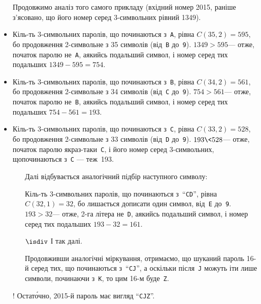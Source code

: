 \begin{\veryLongExamplesFontSize}
\begin{itemize}[leftmargin=*,itemsep=0pt,partopsep=0pt,topsep=0pt,parsep=0pt]
\item[] Продовжимо аналіз того самого прикладу (вхідний номер 2015, раніше з’ясовано, що його номер серед 3-символьних рівний 1349).

\item Кіль-ть 3-символьних паролів, що починаються з~\texttt{A}, рівна ${C(35,2) = 595}$, бо продовження %
2-символьне з 35 символів (від~\texttt{B} до~\texttt{9}). ${1349>595}$\nolinebreak[3] --- отже, початок паролю не~\texttt{A}, а\nolinebreak[2] якийсь подальший символ, і номер %
серед тих подальших ${1349-595=754}$.

\item Кіль-ть 3-символьних паролів, що починаються з~\texttt{B}, рівна ${C(34,2) = 561}$, бо продовження %
2-символьне з 34 символів (від~\texttt{C} до~\texttt{9}). ${754>561}$\nolinebreak[3] --- отже, початок паролю не~\texttt{B}, а\nolinebreak[2] якийсь подальший символ, і номер %
серед тих подальших ${754-561=193}$.

\item Кіль-ть 3-символьних паролів, що починаються з~\texttt{C}, рівна ${C(33,2) = 528}$, бо продовження %
2-символьне з 33 символів (від~\texttt{D} до~\texttt{9}). ${193\<528}$\nolinebreak[3] --- отже, початок паролю якраз-таки~\texttt{C}, і його номер серед 3-символьних, що\nolinebreak[3] починаються з~\texttt{C} --- теж~193.

\begin{itemize}[leftmargin=*,itemsep=0pt,partopsep=0pt,topsep=0pt,parsep=0pt]
\item[] Далі відбувається аналогічний підбір наступного символу:

\item[\textopenbullet] Кіль-ть 3-символьних паролів, що починаються з~``\texttt{CD}'', рівна ${C(32,1)=32}$, бо лишається дописати один символ, від~\texttt{E} до~\texttt{9}. ${193>32}$\nolinebreak[3] --- отже, 2-га літера не~\texttt{D}, а\nolinebreak[3] якийсь подальший символ, і номер %
серед тих подальших ${193-32=161}$.

\item[$\isdiv$] І так далі.

\item[\textopenbullet] Продовживши аналогічні міркування, отримаємо, що шуканий пароль \mbox{16-й} серед тих, що починаються з~``\texttt{CJ}'', а оскільки після~\texttt{J} можуть іти лише символи, починаючи з~\texttt{K}, то цим 16-м буде~\texttt{Z}.
\end{itemize}

\item[!] Остат\'{о}чно, 2015-й пароль має вигляд ``\texttt{CJZ}''.
\end{itemize}
\end{\veryLongExamplesFontSize}

